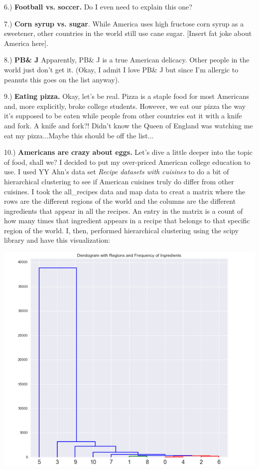 \documentclass[14pt]{extarticle}
\begin{document}
\vspace{5mm}
6.) \textbf{Football vs. soccer.} Do I even need to explain this one?

\vspace{5mm}
7.) \textbf{Corn syrup vs. sugar}. While America uses high fructose corn syrup as a sweetener, other countries in the world still use cane sugar. [Insert fat joke about America here]. 

\vspace{5mm}
8.) \textbf{PB\& J} Apparently, PB\& J is a true American delicacy. Other people in the world just don't get it. (Okay, I admit I love PB\& J but since I'm allergic to peanuts this goes on the list anyway). 

\vspace{5mm}
9.) \textbf{Eating pizza.} Okay, let's be real. Pizza is a staple food for most Americans and, more explicitly, broke college students. However, we eat our pizza the way it's supposed to be eaten while people from other countries eat it with a knife and fork. A knife and fork?! Didn't know the Queen of England was watching me eat my pizza...Maybe this should be off the list...

\vspace{5mm}
10.) \textbf{Americans are crazy about eggs.} Let's dive a little deeper into the topic of food, shall we? I decided to put my over-priced American college education to use. I used YY Ahn's data set \textit{Recipe datasets with cuisines} to do a  bit of hierarchical clustering to see if American cuisines truly do differ from other cuisines. I took the all\_recipes data and map data to creat a matrix where the rows are the different regions of the world and the columns are the different ingredients that appear in all the recipes. An entry in the matrix is a count of how many times that ingredient appears in a recipe that belongs to that specific region of the world. I, then, performed hierarchical clustering using the scipy library and have this visualization: 

\centering
\begin{minipage}[t]{.9\textwidth}
	\includegraphics[width=\textwidth]{Regions_Ingredients.png}
\end{minipage}
\end{document}
